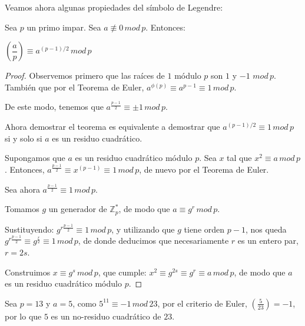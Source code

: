 \hfil

Veamos ahora algunas propiedades del símbolo de Legendre:

\begin{theorem}
	Sea $p$ un primo impar. Sea $a \not\equiv 0 \, mod \, p$. Entonces:
	
 	\begin{center}
 		$ \left( \dfrac{a}{p} \right)  \equiv a^{(p-1)/2}  \, mod \, p$
 	\end{center}
	
\end{theorem}

\hfil

\begin{proof}
	Observemos primero que las raíces de $1$ módulo $p$ son $1$ y $-1$ $mod\, p$. También que por el Teorema de Euler, $a^{\phi(p)} \equiv a^{p-1} \equiv 1 \, mod \, p$.
	
	De este modo, tenemos que $ a^{\frac{p-1}{2}} \equiv \pm 1 \, mod \, p$.
	
	Ahora demostrar el teorema es equivalente a demostrar que $a^{(p-1)/2} \equiv 1 \, mod \, p$ si y solo si $a$ es un residuo cuadrático.
	
	\hfil
	
	Supongamos que $a$ es un residuo cuadrático módulo $p$. Sea $x$ tal que $x^2 \equiv a \, mod \, p$. Entonces, $ a^{\frac{p-1}{2}} \equiv x^{(p-1)} \equiv 1 \, mod \, p$, de nuevo por el Teorema de Euler.
	
	\hfil
	
	Sea ahora  $ a^{\frac{p-1}{2}} \equiv 1 \, mod \, p$.
	
	Tomamos $g$ un generador de $\mathbb{Z}^*_p$, de modo que $a \equiv g^r \, mod \, p$.
	
	Sustituyendo:
	 $ g^{r\frac{p-1}{2}} \equiv 1 \, mod \, p$, 
	 y utilizando que $g$ tiene orden $p-1$, nos queda $ g^{r\frac{p-1}{2}} \equiv g^{\frac{r}{2}} \equiv 1 \, mod \, p$, de donde deducimos que necesariamente $r$ es un entero par, $r = 2s$.
	 
	 Construimos $x \equiv g^s \, mod \, p$, que cumple:
	 $x^2 \equiv g^{2s} \equiv g^r \equiv a \, mod \, p$,
	 de modo que $a$ es un residuo cuadrático módulo $p$.
	
\end{proof}


\begin{example}
	Sea $p=13$ y $a=5$, como $5^{11}\equiv -1 \, mod \, 23$, por el criterio de Euler, $\left( \frac{5}{23} \right) = -1$, por lo que $5$ es un no-residuo cuadrático de $23$.
\end{example}


